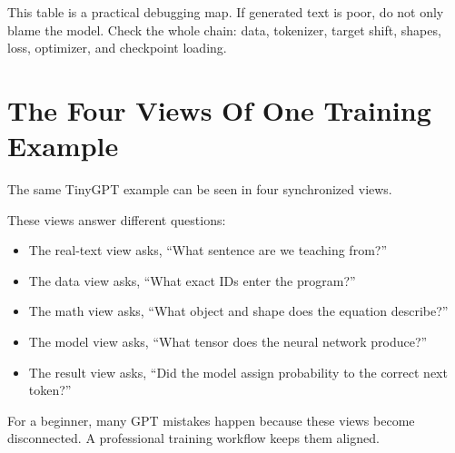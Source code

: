 This table is a practical debugging map. If generated text is poor, do not only blame the model. Check the whole chain: data, tokenizer, target shift, shapes, loss, optimizer, and checkpoint loading.

\section{The Four Views Of One Training Example}

The same TinyGPT example can be seen in four synchronized views.

\begin{center}
\end{center}

These views answer different questions:

\begin{itemize}
  \item The real-text view asks, ``What sentence are we teaching from?''
  \item The data view asks, ``What exact IDs enter the program?''
  \item The math view asks, ``What object and shape does the equation describe?''
  \item The model view asks, ``What tensor does the neural network produce?''
  \item The result view asks, ``Did the model assign probability to the correct next token?''
\end{itemize}

For a beginner, many GPT mistakes happen because these views become disconnected. A professional training workflow keeps them aligned.

